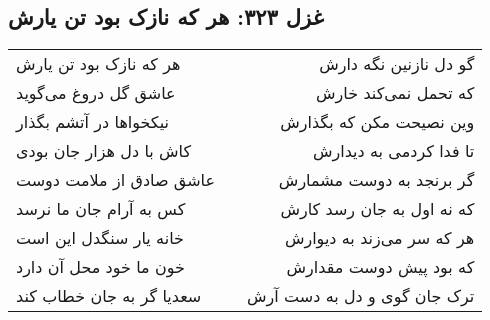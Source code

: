 \begin{center}
\section*{غزل ۳۲۳: هر که نازک بود تن یارش}
\label{sec:323}
\begin{longtable}{l p{0.5cm} r}
هر که نازک بود تن یارش
&&
گو دل نازنین نگه دارش
\\
عاشق گل دروغ می‌گوید
&&
که تحمل نمی‌کند خارش
\\
نیکخواها در آتشم بگذار
&&
وین نصیحت مکن که بگذارش
\\
کاش با دل هزار جان بودی
&&
تا فدا کردمی به دیدارش
\\
عاشق صادق از ملامت دوست
&&
گر برنجد به دوست مشمارش
\\
کس به آرام جان ما نرسد
&&
که نه اول به جان رسد کارش
\\
خانه یار سنگدل این است
&&
هر که سر می‌زند به دیوارش
\\
خون ما خود محل آن دارد
&&
که بود پیش دوست مقدارش
\\
سعدیا گر به جان خطاب کند
&&
ترک جان گوی و دل به دست آرش
\\
\end{longtable}
\end{center}
